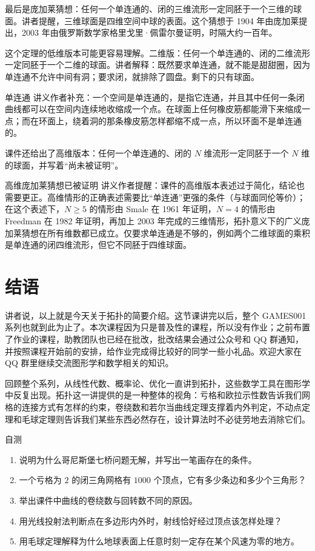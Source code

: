 \documentclass[a4paper]{article}
\begin{document}
最后是庞加莱猜想：任何一个单连通的、闭的三维流形一定同胚于一个三维的球面。讲者提醒，三维球面是四维空间中球的表面。这个猜想于 1904 年由庞加莱提出，2003 年由俄罗斯数学家格里戈里·佩雷尔曼证明，时隔大约一百年。

这个定理的低维版本可能更容易理解。二维版：任何一个单连通的、闭的二维流形一定同胚于一个二维的球面。讲者解释：既然要求单连通，就不能是甜甜圈，因为单连通不允许中间有洞；要求闭，就排除了圆盘。剩下的只有球面。

\begin{knowledgebox}{单连通}
讲义作者补充：一个空间是单连通的，是指它连通，并且其中任何一条闭曲线都可以在空间内连续地收缩成一个点。在球面上任何橡皮筋都能滑下来缩成一点；而在环面上，绕着洞的那条橡皮筋怎样都缩不成一点，所以环面不是单连通的。
\end{knowledgebox}

课件还给出了高维版本：任何一个单连通的、闭的 $N$ 维流形一定同胚于一个 $N$ 维的球面，并写着“尚未被证明”。

\begin{warningbox}{高维庞加莱猜想已被证明}
讲义作者提醒：课件的高维版本表述过于简化，结论也需要更正。高维情形的正确表述需要比“单连通”更强的条件（与球面同伦等价）；在这个表述下，$N\ge 5$ 的情形由 Smale 在 1961 年证明，$N=4$ 的情形由 Freedman 在 1982 年证明，再加上 2003 年完成的三维情形，拓扑意义下的广义庞加莱猜想在所有维数都已成立。仅要求单连通是不够的，例如两个二维球面的乘积是单连通的闭四维流形，但它不同胚于四维球面。
\end{warningbox}

\section{结语}

讲者说，以上就是今天关于拓扑的简要介绍。这节课讲完以后，整个 GAMES001 系列也就到此为止了。本次课程因为只是普及性的课程，所以没有作业；之前布置了作业的课程，助教团队也已经在批改，批改结果会通过公众号和 QQ 群通知，并按照课程开始前的安排，给作业完成得比较好的同学一些小礼品。欢迎大家在 QQ 群里继续交流图形学和数学相关的知识。

回顾整个系列，从线性代数、概率论、优化一直讲到拓扑，这些数学工具在图形学中反复出现。拓扑这一讲提供的是一种整体的视角：亏格和欧拉示性数告诉我们网格的连接方式有怎样的约束，卷绕数和若尔当曲线定理支撑着内外判定，不动点定理和毛球定理则告诉我们某些东西必然存在，设计算法时不必徒劳地去消除它们。

\begin{practicebox}{自测}
\begin{enumerate}
\item 说明为什么哥尼斯堡七桥问题无解，并写出一笔画存在的条件。
\item 一个亏格为 $2$ 的闭三角网格有 $1000$ 个顶点，它有多少条边和多少个三角形？
\item 举出课件中曲线的卷绕数与回转数不同的原因。
\item 用光线投射法判断点在多边形内外时，射线恰好经过顶点该怎样处理？
\item 用毛球定理解释为什么地球表面上任意时刻一定存在某个风速为零的地方。
\end{enumerate}
\end{practicebox}
\end{document}
